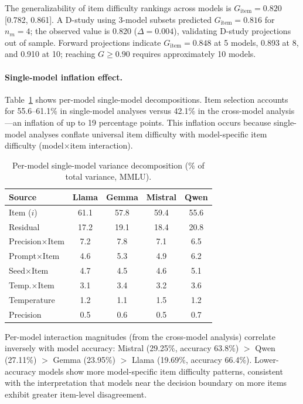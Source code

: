 \documentclass[letterpaper]{article}
\begin{document}
The generalizability of item difficulty rankings across models is $G_{\text{item}} = 0.820$ [0.782, 0.861].
A D-study using 3-model subsets predicted $G_{\text{item}} = 0.816$ for $n_m = 4$; the observed value is 0.820 ($\Delta = 0.004$), validating D-study projections out of sample.
Forward projections indicate $G_{\text{item}} = 0.848$ at 5 models, 0.893 at 8, and 0.910 at 10; reaching $G \geq 0.90$ requires approximately 10 models.

\paragraph{Single-model inflation effect.}
Table~\ref{tab:per_model_decomp} shows per-model single-model decompositions.
Item selection accounts for 55.6--61.1\% in single-model analyses versus 42.1\% in the cross-model analysis---an inflation of up to 19 percentage points.
This inflation occurs because single-model analyses conflate universal item difficulty with model-specific item difficulty (model$\times$item interaction).

\begin{table}[t]
\centering
\caption{Per-model single-model variance decomposition (\% of total variance, MMLU).}
\label{tab:per_model_decomp}
\begin{tabular}{lcccc}
\toprule
Source & Llama & Gemma & Mistral & Qwen \\
\midrule
Item ($i$)             & 61.1 & 57.8 & 59.4 & 55.6 \\
Residual               & 17.2 & 19.1 & 18.4 & 20.8 \\
Precision$\times$Item  & 7.2  & 7.8  & 7.1  & 6.5  \\
Prompt$\times$Item     & 4.6  & 5.3  & 4.9  & 6.2  \\
Seed$\times$Item       & 4.7  & 4.5  & 4.6  & 5.1  \\
Temp.$\times$Item      & 3.1  & 3.4  & 3.2  & 3.6  \\
Temperature            & 1.2  & 1.1  & 1.5  & 1.2  \\
Precision              & 0.5  & 0.6  & 0.5  & 0.7  \\
\bottomrule
\end{tabular}
\end{table}

Per-model interaction magnitudes (from the cross-model analysis) correlate inversely with model accuracy: Mistral (29.25\%, accuracy 63.8\%) $>$ Qwen (27.11\%) $>$ Gemma (23.95\%) $>$ Llama (19.69\%, accuracy 66.4\%).
Lower-accuracy models show more model-specific item difficulty patterns, consistent with the interpretation that models near the decision boundary on more items exhibit greater item-level disagreement.
\end{document}
